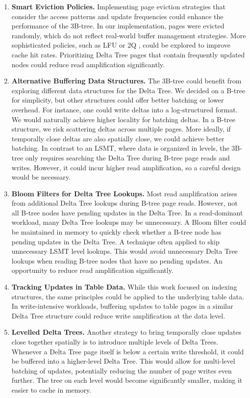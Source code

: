 \begin{enumerate}
    \item \textbf{Smart Eviction Policies.}
    Implementing  page eviction strategies that consider the access patterns and update frequencies could enhance the performance of the 3B-tree.
    In our implementation, pages were evicted randomly, which do not reflect real-world buffer management strategies.
    More sophisticated policies, such as LFU or 2Q \cite{mdbs2024slides}, could be explored to improve cache hit rates.
    Prioritizing Delta Tree pages that contain frequently updated nodes could reduce read amplification significantly.
    \item \textbf{Alternative Buffering Data Structures.}
    The 3B-tree could benefit from exploring different data structures for the Delta Tree.
    We decided on a B-tree for simplicity, but other structures could offer better batching or lower overhead.
    For instance, one could write deltas into a log-structured format. 
    We would naturally achieve higher locality for batching deltas.
    In a B-tree structure, we risk scattering deltas across multiple pages.
    More ideally, if temporally close deltas are also spatially close, we could achieve better batching.
    In contrast to an \ac{LSMT}, where data is organized in levels, the 3B-tree only requires searching the Delta Tree during B-tree page reads and writes.
    However, it could incur higher read amplification, so a careful design would be necessary.
    \item \textbf{Bloom Filters for Delta Tree Lookups.}
    Most read amplification arises from additional Delta Tree lookups during B-tree page reads.
    However, not all B-tree nodes have pending updates in the Delta Tree.
    In a read-dominant workload, many Delta Tree lookups may be unnecessary.
    A Bloom filter could be maintained in memory to quickly check whether a B-tree node has pending updates in the Delta Tree.
    A technique often applied to skip unnecessary \ac{LSMT} level lookups.
    This would avoid unnecessary Delta Tree lookups when reading B-tree nodes that have no pending updates.
    An opportunity to reduce read amplification significantly.
    \item \textbf{Tracking Updates in Table Data.}
    While this work focused on indexing structures, the same principles could be applied to the underlying table data.
    In write-intensive workloads, buffering updates to table pages in a similar Delta Tree structure could reduce write amplification at the data level.
    \item \textbf{Levelled Delta Trees.}
    Another strategy to bring temporally close updates close together spatially is to introduce multiple levels of Delta Trees.
    Whenever a Delta Tree page itself is below a certain write threshold, it could be buffered into a higher-level Delta Tree.
    This would allow for multi-level batching of updates, potentially reducing the number of page writes even further.
    The tree on each level would become significantly smaller, making it easier to cache in memory.
\end{enumerate}

